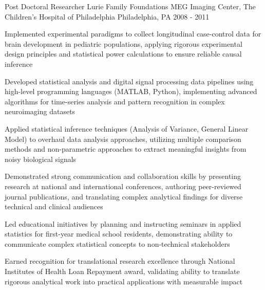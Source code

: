 \begin{cventries}
  \cventry
  {Post Doctoral Researcher} %
  {Lurie Family Foundations MEG Imaging Center, The Children's Hospital of Philadelphia} %
  {Philadelphia, PA} %
  {2008 - 2011} %
  {
    \begin{cvitems} %
      \vspace{2mm}
      \item Implemented experimental paradigms to collect longitudinal case-control data for brain development in pediatric populations, applying rigorous experimental design principles and statistical power calculations to ensure reliable causal inference
      \item Developed statistical analysis and digital signal processing data pipelines using high-level programming languages (MATLAB, Python), implementing advanced algorithms for time-series analysis and pattern recognition in complex neuroimaging datasets
      \item Applied statistical inference techniques (Analysis of Variance, General Linear Model) to overhaul data analysis approaches, utilizing multiple comparison methods and non-parametric approaches to extract meaningful insights from noisy biological signals
      \item Demonstrated strong communication and collaboration skills by presenting research at national and international conferences, authoring peer-reviewed journal publications, and translating complex analytical findings for diverse technical and clinical audiences
      \item Led educational initiatives by planning and instructing seminars in applied statistics for first-year medical school residents, demonstrating ability to communicate complex statistical concepts to non-technical stakeholders
      \item Earned recognition for translational research excellence through National Institutes of Health Loan Repayment award, validating ability to translate rigorous analytical work into practical applications with measurable impact
         \end{cvitems}
    \vspace{2mm}
  }
\end{cventries}
